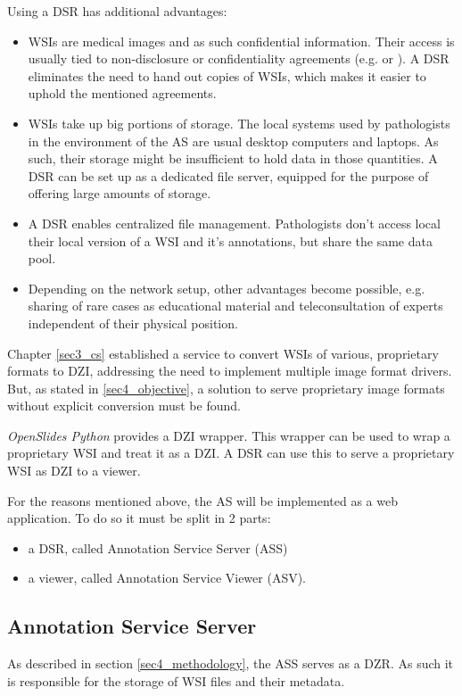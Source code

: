 Using a DSR has additional advantages: 
\begin{itemize}
	\item WSIs are medical images and as such confidential information. Their access is usually tied to non-disclosure or confidentiality agreements (e.g. \cite{COA} or \cite{USSanDiego}). A DSR eliminates the need to hand out copies of WSIs, which makes it easier to uphold the mentioned agreements.
	\item WSIs take up big portions of storage\cite{Singh11}. The local systems used by pathologists in the environment of the AS are usual desktop computers and laptops. As such, their storage might be insufficient to hold data in those quantities. A DSR can be set up as a dedicated file server, equipped for the purpose of offering large amounts of storage.
	\item A DSR enables centralized file management. Pathologists don't access local their local version of a WSI and it's annotations, but share the same data pool.
	\item Depending on the network setup, other advantages become possible, e.g. sharing of rare cases as educational material and teleconsultation of experts independent of their physical position\cite{Wilbur09}.
\end{itemize}

Chapter \ref{sec3_cs} established a service to convert WSIs of various, proprietary formats to DZI, addressing the need to implement multiple image format drivers. But, as stated in \ref{sec4_objective}, a solution to serve proprietary image formats without explicit conversion must be found.

\emph{OpenSlides Python} provides a DZI wrapper. This wrapper can be used to wrap a proprietary WSI and treat it as a DZI\cite{web:openslide}. A DSR can use this to serve a proprietary WSI as DZI to a viewer.

For the reasons mentioned above, the AS will be implemented as a web application. To do so it must be split in 2 parts:
\begin{itemize}
	\item a DSR, called Annotation Service Server (ASS)
	\item a viewer, called Annotation Service Viewer (ASV).
\end{itemize}


\subsection{Annotation Service Server}
\label{sec4_assMethod}
As described in section \ref{sec4_methodology}, the ASS serves as a DZR. As such it is responsible for the storage of WSI files and their metadata\cite{Cornish13}.

